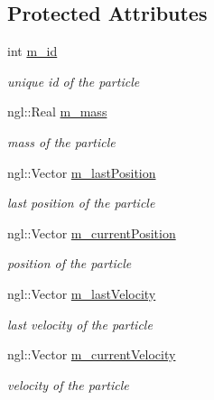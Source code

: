 \subsection*{Protected Attributes}
\begin{DoxyCompactItemize}
\item 
int \hyperlink{class_particle_a24c5edf015f4c3d067acf1a054f31f93}{m\_\-id}
\begin{DoxyCompactList}\small\item\em unique id of the particle \item\end{DoxyCompactList}\item 
ngl::Real \hyperlink{class_particle_ab166ef7b23d6516e11f42adca0d6620e}{m\_\-mass}
\begin{DoxyCompactList}\small\item\em mass of the particle \item\end{DoxyCompactList}\item 
ngl::Vector \hyperlink{class_particle_aeeb21b06bc3c2152e452226e2b25a6ea}{m\_\-lastPosition}
\begin{DoxyCompactList}\small\item\em last position of the particle \item\end{DoxyCompactList}\item 
ngl::Vector \hyperlink{class_particle_aac033d4c7197975a3ed76dba63108475}{m\_\-currentPosition}
\begin{DoxyCompactList}\small\item\em position of the particle \item\end{DoxyCompactList}\item 
ngl::Vector \hyperlink{class_particle_ac5c460e66588981d09c3aa86b920d8bb}{m\_\-lastVelocity}
\begin{DoxyCompactList}\small\item\em last velocity of the particle \item\end{DoxyCompactList}\item 
ngl::Vector \hyperlink{class_particle_a00a3cb9ed10bf70c3a4e20f631ef7b0a}{m\_\-currentVelocity}
\begin{DoxyCompactList}\small\item\em velocity of the particle \item\end{DoxyCompactList}\item 

\end{DoxyCompactItemize}

